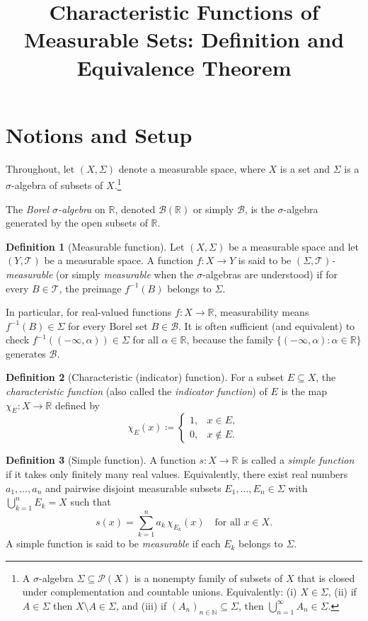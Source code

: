 \documentclass[12pt]{article}
\title{Characteristic Functions of Measurable Sets: Definition and Equivalence Theorem}
\author{}
\date{}
\theoremstyle{plain}
\theoremstyle{definition}
\newtheorem{definition}{Definition}
\newcommand{\R}{\mathbb{R}}
\newcommand{\B}{\mathcal{B}}
\newcommand{\Sig}{\Sigma}
\begin{document}
\maketitle

\section*{Notions and Setup}
Throughout, let \((X,\Sig)\) denote a measurable space, where \(X\) is a set and \(\Sig\) is a \(\sigma\)-algebra of subsets of \(X\).\footnote{A \(\sigma\)-algebra \(\Sig \subseteq \mathcal{P}(X)\) is a nonempty family of subsets of \(X\) that is closed under complementation and countable unions. Equivalently: (i) \(X \in \Sig\), (ii) if \(A \in \Sig\) then \(X \setminus A \in \Sig\), and (iii) if \((A_n)_{n\in\mathbb{N}} \subseteq \Sig\), then \(\bigcup_{n=1}^\infty A_n \in \Sig\).} 

The \emph{Borel \(\sigma\)-algebra} on \(\R\), denoted \(\B(\R)\) or simply \(\B\), is the \(\sigma\)-algebra generated by the open subsets of \(\R\).

\begin{definition}[Measurable function]
Let \((X,\Sig)\) be a measurable space and let \((Y,\mathcal{T})\) be a measurable space. A function \(f:X \to Y\) is said to be \((\Sig,\mathcal{T})\)\emph{-measurable} (or simply \emph{measurable} when the \(\sigma\)-algebras are understood) if for every \(B \in \mathcal{T}\), the preimage \(f^{-1}(B)\) belongs to \(\Sig\).
\end{definition}

In particular, for real-valued functions \(f:X \to \R\), measurability means \(f^{-1}(B) \in \Sig\) for every Borel set \(B \in \B\). It is often sufficient (and equivalent) to check \(f^{-1}((-\infty,\alpha)) \in \Sig\) for all \(\alpha \in \R\), because the family \(\{(-\infty,\alpha):\alpha\in\R\}\) generates \(\B\).

\begin{definition}[Characteristic (indicator) function]
For a subset \(E \subseteq X\), the \emph{characteristic function} (also called the \emph{indicator function}) of \(E\) is the map \(\chi_E:X \to \R\) defined by
\[
\chi_E(x) \coloneqq
\begin{cases}
1, & x \in E,\\
0, & x \notin E.
\end{cases}
\]
\end{definition}

\begin{definition}[Simple function]
A function \(s:X \to \R\) is called a \emph{simple function} if it takes only finitely many real values. Equivalently, there exist real numbers \(a_1,\dots,a_n\) and pairwise disjoint measurable subsets \(E_1,\dots,E_n \in \Sig\) with \(\bigcup_{k=1}^n E_k = X\) such that
\[
s(x) = \sum_{k=1}^n a_k\, \chi_{E_k}(x) \quad \text{for all } x \in X.
\]
A simple function is said to be \emph{measurable} if each \(E_k\) belongs to \(\Sig\).
\end{definition}
\end{document}
